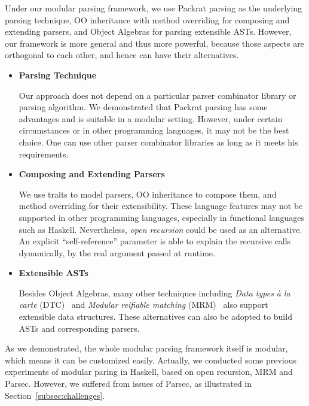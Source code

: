 Under our modular parsing framework, we use Packrat parsing as the underlying parsing technique, OO inheritance with method overriding for composing and extending parsers, and Object Algebras for parsing extensible ASTs. However, our framework is more general and thus more powerful, because those aspects are orthogonal to each other, and hence can have their alternatives.

\begin{itemize}

\item {\bf Parsing Technique}

Our approach does not depend on a particular parser combinator library or parsing algorithm. We demonstrated that Packrat parsing has some advantages and is suitable in a modular setting. However, under certain circumstances or in other programming languages, it may not be the best choice. One can use other parser combinator libraries as long as it meets his requirements.

\item {\bf Composing and Extending Parsers}

We use traits to model parsers, OO inheritance to compose them, and method overriding for their extensibility. These language features may not be supported in other programming languages, especially in functional languages such as Haskell. Nevertheless, \textit{open recursion} could be used as an alternative. An explicit ``self-reference'' parameter is able to explain the recursive calls dynamically, by the real argument passed at runtime.

\item {\bf Extensible ASTs}

Besides Object Algebras, many other techniques including \textit{Data types à la carte} (DTC)~\cite{swierstra2008data} and \textit{Modular reifiable matching} (MRM)~\cite{Oliveira2015} also support extensible data structures. These alternatives can also be adopted to build ASTs and corresponding parsers.

\end{itemize}

As we demonstrated, the whole modular parsing framework itself is modular, which means it can be customized easily. Actually, we conducted some previous experiments of modular paring in Haskell, based on open recursion, MRM and Parsec. However, we suffered from issues of Parsec, as illustrated in Section~\ref{subsec:challenges}.
